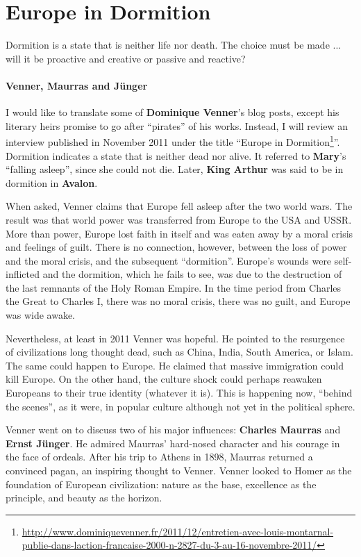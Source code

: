 \section{Europe in Dormition}

Dormition is a state that is neither life nor death. The choice must be made ... will it be proactive and creative or passive and reactive?

\paragraph{Venner, Maurras and Jünger}


I would like to translate some of \textbf{Dominique Venner}'s blog posts, except his literary heirs promise to go after ``pirates'' of his works. Instead, I will review an interview published in November 2011 under the title ``Europe in Dormition\footnote{\url{http://www.dominiquevenner.fr/2011/12/entretien-avec-louis-montarnal-publie-dans-laction-francaise-2000-n-2827-du-3-au-16-novembre-2011/}}''. Dormition indicates a state that is neither dead nor alive. It referred to \textbf{Mary}'s ``falling asleep'', since she could not die. Later, \textbf{King Arthur} was said to be in dormition in \textbf{Avalon}.

When asked, Venner claims that Europe fell asleep after the two world wars. The result was that world power was transferred from Europe to the USA and USSR. More than power, Europe lost faith in itself and was eaten away by a moral crisis and feelings of guilt. There is no connection, however, between the loss of power and the moral crisis, and the subsequent ``dormition''. Europe's wounds were self-inflicted and the dormition, which he fails to see, was due to the destruction of the last remnants of the Holy Roman Empire. In the time period from Charles the Great to Charles I, there was no moral crisis, there was no guilt, and Europe was wide awake.

Nevertheless, at least in 2011 Venner was hopeful. He pointed to the resurgence of civilizations long thought dead, such as China, India, South America, or Islam. The same could happen to Europe. He claimed that massive immigration could kill Europe. On the other hand, the culture shock could perhaps reawaken Europeans to their true identity (whatever it is). This is happening now, ``behind the scenes'', as it were, in popular culture although not yet in the political sphere.

Venner went on to discuss two of his major influences: \textbf{Charles Maurras} and \textbf{Ernst Jünger}. He admired Maurras' hard-nosed character and his courage in the face of ordeals. After his trip to Athens in 1898, Maurras returned a convinced pagan, an inspiring thought to Venner. Venner looked to Homer as the foundation of European civilization: nature as the base, excellence as the principle, and beauty as the horizon.

